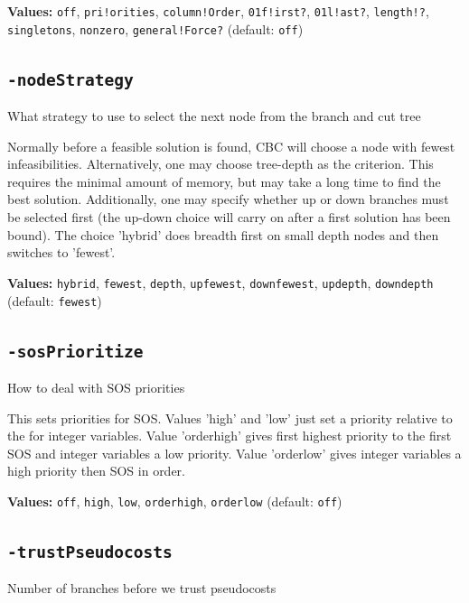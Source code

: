 \documentclass[11pt,a4paper]{article}
\begin{document}
\textbf{Values:} \texttt{off}, \texttt{pri!orities}, \texttt{column!Order}, \texttt{01f!irst?}, \texttt{01l!ast?}, \texttt{length!?}, \texttt{singletons}, \texttt{nonzero}, \texttt{general!Force?} (default: \texttt{off})

\subsection*{\texttt{-nodeStrategy}}

What strategy to use to select the next node from the branch and cut tree

Normally before a feasible solution is found, CBC will choose a node with fewest infeasibilities. Alternatively, one may choose tree-depth as the criterion. This requires the minimal amount of memory, but may take a long time to find the best solution. Additionally, one may specify whether up or down branches must be selected first (the up-down choice will carry on after a first solution has been bound). The choice 'hybrid' does breadth first on small depth nodes and then switches to 'fewest'.

\textbf{Values:} \texttt{hybrid}, \texttt{fewest}, \texttt{depth}, \texttt{upfewest}, \texttt{downfewest}, \texttt{updepth}, \texttt{downdepth} (default: \texttt{fewest})

\subsection*{\texttt{-sosPrioritize}}

How to deal with SOS priorities

This sets priorities for SOS.  Values 'high' and 'low' just set a priority relative to the for integer variables.  Value 'orderhigh' gives first highest priority to the first SOS and integer variables a low priority.  Value 'orderlow' gives integer variables a high priority then SOS in order.

\textbf{Values:} \texttt{off}, \texttt{high}, \texttt{low}, \texttt{orderhigh}, \texttt{orderlow} (default: \texttt{off})

\subsection*{\texttt{-trustPseudocosts}}

Number of branches before we trust pseudocosts
\end{document}
